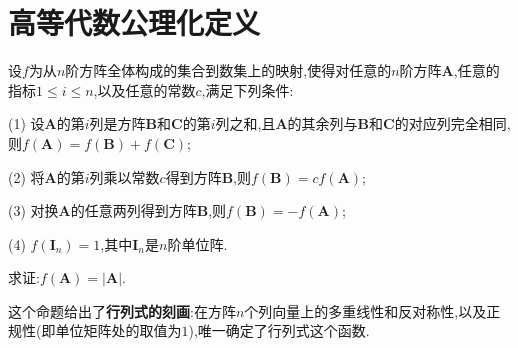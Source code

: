 \documentclass[../../main.tex]{subfiles}%
\begin{document}
\section{高等代数公理化定义}

\begin{theorem}[行列式的刻画]\label{theorem:行列式的刻画}
设$f$为从$n$阶方阵全体构成的集合到数集上的映射,使得对任意的$n$阶方阵$\boldsymbol{A}$,任意的指标$1\leqslant  i\leqslant  n$,以及任意的常数$c$,满足下列条件:

(1) 设$\boldsymbol{A}$的第$i$列是方阵$\boldsymbol{B}$和$\boldsymbol{C}$的第$i$列之和,且$\boldsymbol{A}$的其余列与$\boldsymbol{B}$和$\boldsymbol{C}$的对应列完全相同,则$f(\boldsymbol{A})=f(\boldsymbol{B})+f(\boldsymbol{C})$;

(2) 将$\boldsymbol{A}$的第$i$列乘以常数$c$得到方阵$\boldsymbol{B}$,则$f(\boldsymbol{B})=cf(\boldsymbol{A})$;

(3) 对换$\boldsymbol{A}$的任意两列得到方阵$\boldsymbol{B}$,则$f(\boldsymbol{B})= - f(\boldsymbol{A})$;

(4) $f(\boldsymbol{I}_n)=1$,其中$\boldsymbol{I}_n$是$n$阶单位阵.

求证:$f(\boldsymbol{A})=\vert \boldsymbol{A}\vert$.
\end{theorem}
\begin{note}
这个命题给出了\textbf{行列式的刻画}:在方阵\(n\)个列向量上的多重线性和反对称性,以及正规性(即单位矩阵处的取值为\(1\)),唯一确定了行列式这个函数.
\end{note}
\end{document}
